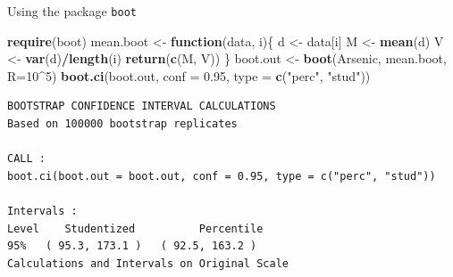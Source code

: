\documentclass[
  ignorenonframetext,
]{beamer}
\newenvironment{Shaded}{\begin{snugshade}}{\end{snugshade}}
\newcommand{\AttributeTok}[1]{\textcolor[rgb]{0.13,0.29,0.53}{#1}}
\newcommand{\ControlFlowTok}[1]{\textcolor[rgb]{0.13,0.29,0.53}{\textbf{#1}}}
\newcommand{\DecValTok}[1]{\textcolor[rgb]{0.00,0.00,0.81}{#1}}
\newcommand{\FloatTok}[1]{\textcolor[rgb]{0.00,0.00,0.81}{#1}}
\newcommand{\FunctionTok}[1]{\textcolor[rgb]{0.13,0.29,0.53}{\textbf{#1}}}
\newcommand{\NormalTok}[1]{#1}
\newcommand{\OtherTok}[1]{\textcolor[rgb]{0.56,0.35,0.01}{#1}}
\newcommand{\SpecialCharTok}[1]{\textcolor[rgb]{0.81,0.36,0.00}{\textbf{#1}}}
\newcommand{\StringTok}[1]{\textcolor[rgb]{0.31,0.60,0.02}{#1}}
\begin{document}
\begin{frame}[fragile]{Using the package \texttt{boot}}
\protect\hypertarget{using-the-package-boot-1}{}
\tiny

\begin{Shaded}
\begin{Highlighting}[]
\FunctionTok{require}\NormalTok{(boot)}
\NormalTok{mean.boot }\OtherTok{\textless{}{-}} \ControlFlowTok{function}\NormalTok{(data, i)\{}
\NormalTok{  d }\OtherTok{\textless{}{-}}\NormalTok{ data[i]}
\NormalTok{  M }\OtherTok{\textless{}{-}} \FunctionTok{mean}\NormalTok{(d)}
\NormalTok{  V }\OtherTok{\textless{}{-}} \FunctionTok{var}\NormalTok{(d)}\SpecialCharTok{/}\FunctionTok{length}\NormalTok{(i)}
  \FunctionTok{return}\NormalTok{(}\FunctionTok{c}\NormalTok{(M, V))}
\NormalTok{\}}
\NormalTok{boot.out }\OtherTok{\textless{}{-}} \FunctionTok{boot}\NormalTok{(Arsenic, mean.boot, }\AttributeTok{R=}\DecValTok{10}\SpecialCharTok{\^{}}\DecValTok{5}\NormalTok{)}
\FunctionTok{boot.ci}\NormalTok{(boot.out, }\AttributeTok{conf =} \FloatTok{0.95}\NormalTok{, }\AttributeTok{type =} \FunctionTok{c}\NormalTok{(}\StringTok{"perc"}\NormalTok{, }\StringTok{"stud"}\NormalTok{))}
\end{Highlighting}
\end{Shaded}

\begin{verbatim}
BOOTSTRAP CONFIDENCE INTERVAL CALCULATIONS
Based on 100000 bootstrap replicates

CALL : 
boot.ci(boot.out = boot.out, conf = 0.95, type = c("perc", "stud"))

Intervals : 
Level    Studentized          Percentile     
95%   ( 95.3, 173.1 )   ( 92.5, 163.2 )  
Calculations and Intervals on Original Scale
\end{verbatim}

\normalsize
\end{frame}
\end{document}
